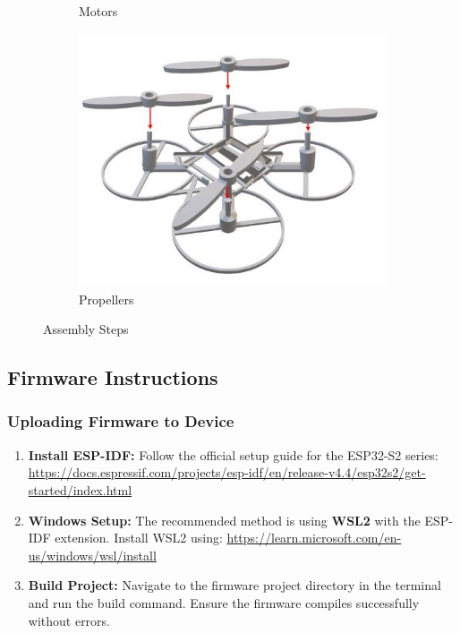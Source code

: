 \begin{manualblock}
\begin{figure}[H]
\begin{subfigure}[b]{0.44\linewidth}
    \caption{Motors}
  \end{subfigure}
  \hfill
  \begin{subfigure}[b]{0.48\linewidth}
    \centering
    \includegraphics[width=\linewidth]{img/manual/assemb3.jpg}
    \caption{Propellers}
  \end{subfigure}
  \caption{Assembly Steps}
\end{figure}

\subsection*{Firmware Instructions}

\subsubsection*{Uploading Firmware to Device}
\begin{enumerate}
  \item \textbf{Install ESP-IDF:} Follow the official setup guide for the ESP32-S2 series:  
  \url{https://docs.espressif.com/projects/esp-idf/en/release-v4.4/esp32s2/get-started/index.html}
  
  \item \textbf{Windows Setup:} The recommended method is using \textbf{WSL2} with the ESP-IDF extension.  
  Install WSL2 using: \url{https://learn.microsoft.com/en-us/windows/wsl/install}
  
  \item \textbf{Build Project:} Navigate to the firmware project directory in the terminal and run the build command. Ensure the firmware compiles successfully without errors.
  

\end{enumerate}
\end{manualblock}
